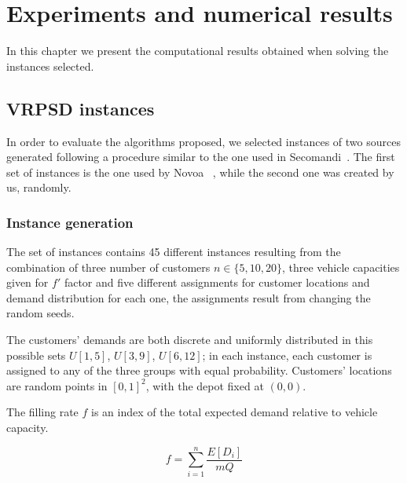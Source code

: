 \chapter{Experiments and numerical results}
\label{chap:results}

In this chapter we present the computational results obtained when solving the instances selected. 


\section{VRPSD instances}

In order to evaluate the algorithms proposed, we selected instances of two sources generated following a procedure similar to the one used in Secomandi~\cite{secomandi_comparing_2000}. The first set of instances is the one used by Novoa ~\cite{novoa_approximate_2009}, while the second one was created by us, randomly.

\subsection{Instance generation}

The set of instances contains 45 different instances resulting from the combination of three number of customers $n \in \{5,10,20\}$, three vehicle capacities given for $f'$ factor and five different assignments for customer locations and demand distribution for each one, the assignments result from changing the random seeds.

The customers' demands are both discrete and uniformly distributed in this possible sets $U[1,5]$, $U[3,9]$, $U[6,12]$; in each instance, each customer is assigned to any of the three groups with equal probability. Customers' locations are random points in $[0, 1]^2$, with the depot fixed at $(0,0)$.%


The filling rate $f$ is an index of the total expected demand relative to vehicle capacity.

\begin{equation}\label{eq:4filling-rate}
f=\sum_{i=1}^n\frac{E[D_i]}{mQ}
\end{equation}

